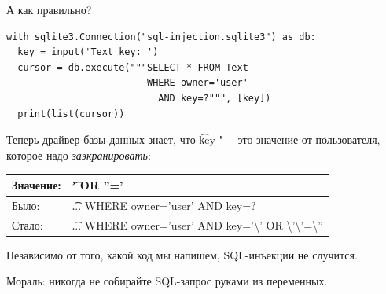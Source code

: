 \begin{frame}[fragile]{А как правильно?}
\begin{verbatim}
with sqlite3.Connection("sql-injection.sqlite3") as db:
  key = input('Text key: ')
  cursor = db.execute("""SELECT * FROM Text
                         WHERE owner='user'
                           AND key=?""", [key])
  print(list(cursor))
\end{verbatim}
	Теперь драйвер базы данных знает, что \t{key} "--- это значение от пользователя,
	которое надо \textit{заэкранировать}:
	\begin{center}
		\begin{tabular}{ll}
			Значение: & \t{' OR ''='} \\\hline
			Было:  & \t{... WHERE owner='user' AND key=?} \\\hline
			Стало: & \t{... WHERE owner='user' AND key='\textbackslash' OR  \textbackslash'\textbackslash'=\textbackslash''} \\
		\end{tabular}
	\end{center}
	Независимо от того, какой код мы напишем, SQL-инъекции не случится.

	Мораль: никогда не собирайте SQL-запрос руками из переменных.
\end{frame}

